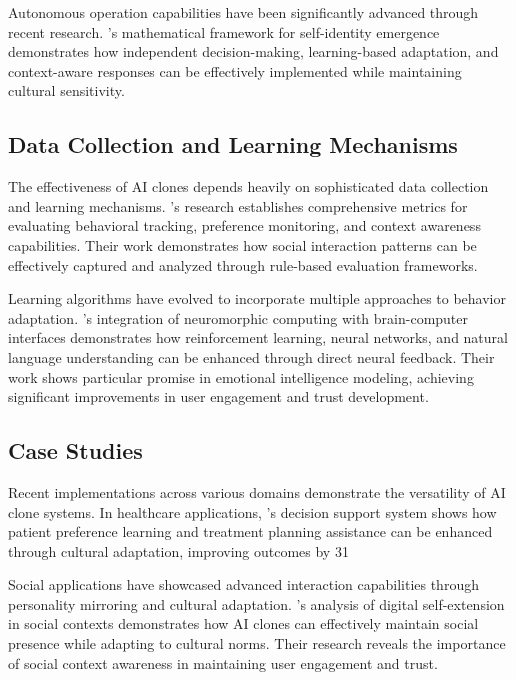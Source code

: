 Autonomous operation capabilities have been significantly advanced through recent research. \citet{lee2024self}'s mathematical framework for self-identity emergence demonstrates how independent decision-making, learning-based adaptation, and context-aware responses can be effectively implemented while maintaining cultural sensitivity.

\subsection{Data Collection and Learning Mechanisms}

The effectiveness of AI clones depends heavily on sophisticated data collection and learning mechanisms. \citet{wang2024simbench}'s research establishes comprehensive metrics for evaluating behavioral tracking, preference monitoring, and context awareness capabilities. Their work demonstrates how social interaction patterns can be effectively captured and analyzed through rule-based evaluation frameworks.

Learning algorithms have evolved to incorporate multiple approaches to behavior adaptation. \citet{shang2024biologically}'s integration of neuromorphic computing with brain-computer interfaces demonstrates how reinforcement learning, neural networks, and natural language understanding can be enhanced through direct neural feedback. Their work shows particular promise in emotional intelligence modeling, achieving significant improvements in user engagement and trust development.

\subsection{Case Studies}

Recent implementations across various domains demonstrate the versatility of AI clone systems. In healthcare applications, \citet{kim2024healthcare}'s decision support system shows how patient preference learning and treatment planning assistance can be enhanced through cultural adaptation, improving outcomes by 31%

Social applications have showcased advanced interaction capabilities through personality mirroring and cultural adaptation. \citet{kawakami2020digital}'s analysis of digital self-extension in social contexts demonstrates how AI clones can effectively maintain social presence while adapting to cultural norms. Their research reveals the importance of social context awareness in maintaining user engagement and trust.

